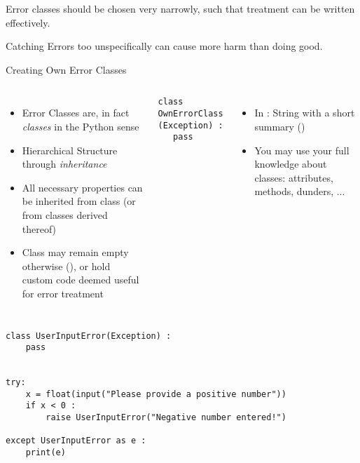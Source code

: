 
\begin{frame}[fragile]{}
%
\begin{hintbox}
Error classes should be chosen very narrowly, such that treatment can be written effectively. 

Catching Errors too unspecifically can cause more harm than doing good.
\end{hintbox}
%
\end{frame}


\begin{frame}[fragile]{Creating Own Error Classes}
%
\begin{columns}[T]
\begin{itemize}
\item Error Classes are, in fact \emph{classes} in the Python sense
\item Hierarchical Structure through \emph{inheritance}
\item All necessary properties can be inherited from class  (or from classes derived thereof)
\item Class may remain empty otherwise (), or hold custom code deemed useful for error treatment
\end{itemize}
%
\begin{codebox}
\begin{verbatim}
class OwnErrorClass (Exception) :
   pass
\end{verbatim}
\end{codebox}
%
\begin{itemize}
\item In : String with a short summary ()
\item You may use your full knowledge about classes: attributes, methods, dunders, ...
\end{itemize}
%
\end{columns}
%
\end{frame}


\begin{frame}[fragile]
%
\begin{codebox}
\begin{verbatim}
class UserInputError(Exception) :
    pass


try:
    x = float(input("Please provide a positive number"))
    if x < 0 :
        raise UserInputError("Negative number entered!")

except UserInputError as e :
    print(e)
\end{verbatim}
\end{codebox}
%
\end{frame}